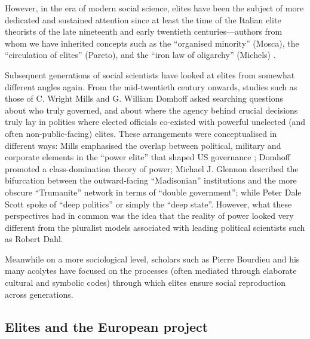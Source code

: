 \documentclass[11pt,a4paper]{article}
\begin{document}
However, in the era of modern social science, elites have been the subject of more dedicated and sustained attention since at least the time of the Italian elite theorists of the late nineteenth and early twentieth centuries---authors from whom we have inherited concepts such as the ``organised minority'' (Mosca), the ``circulation of elites'' (Pareto), and the ``iron law of oligarchy'' (Michels) \cite{carboni2024}.

Subsequent generations of social scientists have looked at elites from somewhat different angles again. From the mid-twentieth century onwards, studies such as those of C. Wright Mills and G. William Domhoff asked searching questions about who truly governed, and about where the agency behind crucial decisions truly lay in polities where elected officials co-existed with powerful unelected (and often non-public-facing) elites. These arrangements were conceptualised in different ways: Mills emphasised the overlap between political, military and corporate elements in the ``power elite'' that shaped US governance \cite{mills1956}; Domhoff promoted a class-domination theory of power; Michael J. Glennon described the bifurcation between the outward-facing ``Madisonian'' institutions and the more obscure ``Trumanite'' network in terms of ``double government''; while Peter Dale Scott spoke of ``deep politics'' or simply the ``deep state''. However, what these perspectives had in common was the idea that the reality of power looked very different from the pluralist models associated with leading political scientists such as Robert Dahl.

Meanwhile on a more sociological level, scholars such as Pierre Bourdieu and his many acolytes have focused on the processes (often mediated through elaborate cultural and symbolic codes) through which elites ensure social reproduction across generations.

\subsection{Elites and the European project}
\end{document}
